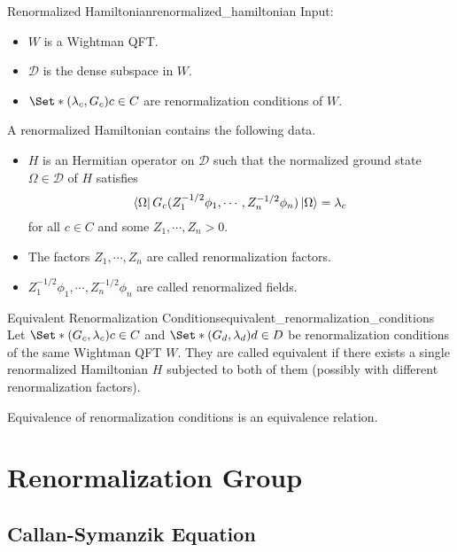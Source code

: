 \documentclass{article}
\begin{document}
\begin{definition}{Renormalized Hamiltonian}{renormalized_hamiltonian}
    Input:
    \begin{itemize}
        \item $W$ is a Wightman QFT.
        \item $\mathcal{D}$ is the dense subspace in $W$.
        \item $\Set*{(\lambda_c, G_c)}{c\in C}$ are renormalization conditions of $W$.
    \end{itemize}
    A renormalized Hamiltonian contains the following data.
    \begin{itemize}
        \item $H$ is an Hermitian operator on $\mathcal{D}$ such that the normalized ground state $\Omega\in\mathcal{D}$ of $H$ satisfies
        \[ \bra{\Omega} G_c(Z_1^{-1/2}\phi_1,\cdots,Z_n^{-1/2}\phi_n) \ket{\Omega} = \lambda_c \]
        for all $c\in C$ and some $Z_1,\cdots,Z_n > 0$.
        \item The factors $Z_1,\cdots,Z_n$ are called renormalization factors.
        \item $Z_1^{-1/2}\phi_1,\cdots,Z_n^{-1/2}\phi_n$ are called renormalized fields.
    \end{itemize}
\end{definition}

\begin{definition}{Equivalent Renormalization Conditions}{equivalent_renormalization_conditions}
    Let $\Set*{(G_c,\lambda_c)}{c\in C}$ and $\Set*{(G_d,\lambda_d)}{d\in D}$ be renormalization conditions of the same Wightman QFT $W$.
    They are called equivalent if there exists a single renormalized Hamiltonian $H$ subjected to both of them (possibly with different renormalization factors).
\end{definition}

Equivalence of renormalization conditions is an equivalence relation.

\section{Renormalization Group}

\subsection{Callan-Symanzik Equation}
\end{document}
